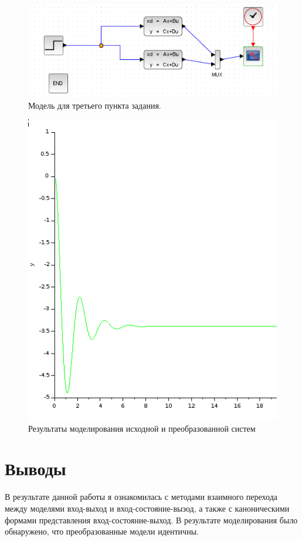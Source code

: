 \documentclass[12pt, a4paper] {ncc}
\begin{document}
	\begin{figure}[ht!]
		\includegraphics[scale=0.5]{./model3.png}
		\caption{Модель для третьего пункта задания.}
	\end{figure}
	\begin{figure}[ht!]
		\includegraphics[scale=0.5]{./plot3.png}
		\caption{Результаты моделирования исходной и преобразованной систем}
	\end{figure}



\section{Выводы}

	В результате данной работы я ознакомилась с методами взаимного перехода между моделями
	вход-выход и вход-состояние-вызод, а также с каноническими формами
	представления вход-состояние-выход. В результате моделирования было обнаружено,
	что преобразованные модели идентичны.
\end{document}
